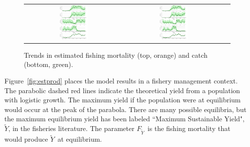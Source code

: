 \documentclass[12pt,letterpaper]{article}
\newcommand\MSY{\widetilde{Y}}
\newcommand\Fmsy{F_{\MSY}}
\begin{document}
\begin{figure}
\begin{center}
{\begin{tabular}{ccc}
\includegraphics[width=0.30\textwidth]{./4-gear-runs_r4_est_catchB1.pdf} &
\includegraphics[width=0.30\textwidth]{./4-gear-runs_r0-sdrprior_est_catchB1.pdf}\\
\end{tabular}
}
\caption{Trends in estimated fishing mortality (top, orange) and 
catch (bottom, green).
\label{fig:estFC}}
\end{center}
\end{figure}

Figure~\ref{fig:estprod} places the model results in a fishery
management context. The parabolic dashed red lines indicate the theoretical
yield from a population with logistic growth. The maximum yield if the
population were at equilibrium would occur at the  peak of the parabola.
There are many possible equilibria, but the  maximum equilibrium yield
has been labeled ``Maximum Sustainable Yield", $\MSY$, in the fisheries
literature.
The parameter $\Fmsy$\ is the fishing mortality that would produce $\MSY$\
at equilibrium. 
\end{document}
